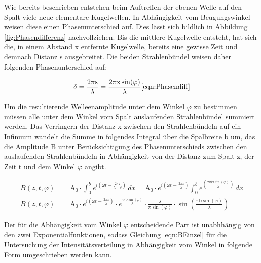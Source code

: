 \documentclass[titlepage = firstcover]{scrartcl}
\begin{document}
            \FloatBarrier

            \noindent

            Wie bereits beschrieben entstehen beim Auftreffen der ebenen Welle auf den Spalt viele neue elementare Kugelwellen. In Abhängigkeit vom Beugungswinkel weisen diese einen Phasenunterschied
            auf. Dies lässt sich bildlich in Abbildung \ref{fig:Phasendifferenz} nachvollziehen. Bis die mittlere Kugelwelle entsteht, hat sich die, in einem Abstand x entfernte Kugelwelle, bereits 
            eine gewisse Zeit und demnach Distanz s ausgebreitet. Die beiden Strahlenbündel weisen daher folgenden Phasenunterschied auf:

            \begin{equation}
                \delta = \frac{2\pi \text{s}}{\lambda} = \frac{2\pi \text{x} \sin(\varphi)}{\lambda}
                \ref{eqn:Phasendiff}
            \end{equation}

            \noindent
            Um die resultierende Welleenamplitude unter dem Winkel $\varphi$ zu bestimmen müssen alle unter dem Winkel vom Spalt auslaufenden Strahlenbündel summiert werden. Das Verringern der 
            Distanz x zwischen den Strahlenbündeln auf ein Infinuum wandelt die Summe in folgendes Integral über die Spalbreite b um, das die Amplitude B unter Berücksichtigung des Phasenunterschieds 
            zwischen den auslaufenden Strahlenbündeln in Abhängigkeit von der Distanz zum Spalt z, der Zeit t und dem Winkel $\varphi$ angibt.

            \begin{align}
                B(z, t, \varphi) &= \text{A}_0 \cdot \int_0^b e^{i\left(\omega t - \frac{2 \pi z}{\lambda + \delta}\right)} \, dx = \text{A}_0 \cdot e^{i\left(\omega t - \frac{2 \pi z}{\lambda}\right)} \int_0^b e^{\left(\frac{2\pi i \text{x} \sin(\varphi)}{\lambda}\right)} \, dx \\
                B(z, t, \varphi) &= \text{A}_0 \cdot e^{i\left(\omega t - \frac{2 \pi z}{\lambda}\right)} \cdot e^{\frac{i \pi \text{b} \sin(\varphi)}{\lambda}} \cdot \frac{\lambda}{\pi \sin(\varphi)} \cdot \sin \left(\frac{\pi \text{b} \sin (\varphi)}{\lambda}\right)
                \label{eqn:BEinzel}
            \end{align}

            \noindent
            Der für die Abhängigkeit vom Winkel $\varphi$ entscheidende Part ist unabhhängig von den zwei Exponentialfunktionen, sodass Gleichung \ref{eqn:BEinzel} für die Untersuchung der 
            Intensitätsverteilung in Abhängigkeit vom Winkel in folgende Form umgeschrieben werden kann.
\end{document}
